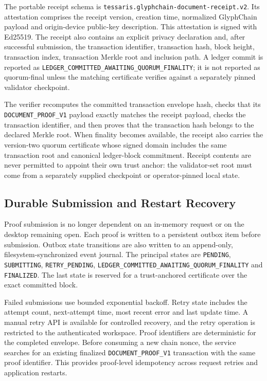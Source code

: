 The portable receipt schema is
\texttt{tessaris.glyphchain-document-receipt.v2}.  Its attestation comprises the
receipt version, creation time, normalized GlyphChain payload and origin-device
public-key description.  This attestation is signed with Ed25519.  The receipt
also contains an explicit privacy declaration and, after successful submission,
the transaction identifier, transaction hash, block height, transaction index,
transaction Merkle root and inclusion path.  A ledger commit is reported as
\texttt{LEDGER\_COMMITTED\_AWAITING\_QUORUM\_FINALITY}; it is not reported as
quorum-final unless the matching certificate verifies against a separately
pinned validator checkpoint.

The verifier recomputes the committed transaction envelope hash, checks that its
\texttt{DOCUMENT\_PROOF\_V1} payload exactly matches the receipt payload, checks
the transaction identifier, and then proves that the transaction hash belongs
to the declared Merkle root.  When finality becomes available, the receipt also
carries the version-two quorum certificate whose signed domain includes the
same transaction root and canonical ledger-block commitment.  Receipt contents
are never permitted to appoint their own trust anchor: the validator-set root
must come from a separately supplied checkpoint or operator-pinned local state.

\subsection{Durable Submission and Restart Recovery}

Proof submission is no longer dependent on an in-memory request or on the
desktop remaining open.  Each proof is written to a persistent outbox item before
submission.  Outbox state transitions are also written to an append-only,
filesystem-synchronized event journal.  The principal states are
\texttt{PENDING}, \texttt{SUBMITTING}, \texttt{RETRY\_PENDING},
\texttt{LEDGER\_COMMITTED\_AWAITING\_QUORUM\_FINALITY} and
\texttt{FINALIZED}.  The last state is reserved for a trust-anchored certificate
over the exact committed block.

Failed submissions use bounded exponential backoff.  Retry state includes the
attempt count, next-attempt time, most recent error and last update time.  A
manual retry API is available for controlled recovery, and the retry operation
is restricted to the authenticated workspace.  Proof identifiers are
deterministic for the completed envelope.  Before consuming a new chain nonce,
the service searches for an existing finalized \texttt{DOCUMENT\_PROOF\_V1}
transaction with the same proof identifier.  This provides proof-level
idempotency across request retries and application restarts.


